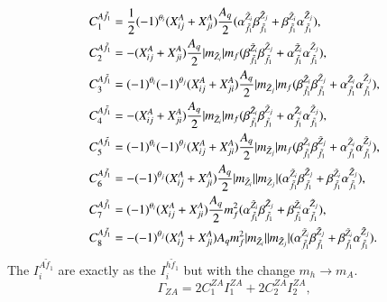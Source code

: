 \documentclass[final,3p,times,pdflatex]{elsarticle}
\begin{document}
\begin{align}
C_{1}^{A \tilde{f}_1} &= \frac{1}{2}(-1)^{\theta_i}(X_{ij}^A + X_{ji}^A) {A_q \over 2} ({\alpha_{\tilde{f}_1}^{\tilde{Z}_i}} {\beta_{\tilde{f}_1}^{\tilde{Z}_j}} + {\beta_{\tilde{f}_1}^{\tilde{Z}_i}}{\alpha_{\tilde{f}_1}^{\tilde{Z}_j}}), \\
C_{2}^{A \tilde{f}_1} &= -(X_{ij}^A + X_{ji}^A) {A_q \over 2} |m_{\tilde{Z}_i}|m_{f} ({\beta_{\tilde{f}_1}^{\tilde{Z}_i}} {\beta_{\tilde{f}_1}^{\tilde{Z}_j}} + {\alpha_{\tilde{f}_1}^{\tilde{Z}_i}}{\alpha_{\tilde{f}_1}^{\tilde{Z}_j}}), \\
C_{3}^{A \tilde{f}_1} &= (-1)^{\theta_i}(-1)^{\theta_j}(X_{ij}^A + X_{ji}^A) {A_q \over 2} |m_{\tilde{Z}_j}|m_{f} ({\beta_{\tilde{f}_1}^{\tilde{Z}_i}} {\beta_{\tilde{f}_1}^{\tilde{Z}_j}} + {\alpha_{\tilde{f}_1}^{\tilde{Z}_i}}{\alpha_{\tilde{f}_1}^{\tilde{Z}_j}}), \\
C_{4}^{A \tilde{f}_1} &= -(X_{ij}^A + X_{ji}^A) {A_q \over 2} |m_{\tilde{Z}_i}|m_{f} ({\beta_{\tilde{f}_1}^{\tilde{Z}_i}} {\beta_{\tilde{f}_1}^{\tilde{Z}_j}} + {\alpha_{\tilde{f}_1}^{\tilde{Z}_i}}{\alpha_{\tilde{f}_1}^{\tilde{Z}_j}}), \\
C_{5}^{A \tilde{f}_1} &= (-1)^{\theta_i}(-1)^{\theta_j}(X_{ij}^A + X_{ji}^A) {A_q \over 2} |m_{\tilde{Z}_j}|m_{f} ({\beta_{\tilde{f}_1}^{\tilde{Z}_i}} {\beta_{\tilde{f}_1}^{\tilde{Z}_j}} + {\alpha_{\tilde{f}_1}^{\tilde{Z}_i}}{\alpha_{\tilde{f}_1}^{\tilde{Z}_j}}), \\
C_{6}^{A \tilde{f}_1} &= -(-1)^{\theta_j}(X_{ij}^A + X_{ji}^A) {A_q \over 2} |m_{\tilde{Z}_i}||m_{\tilde{Z}_j}| ({\alpha_{\tilde{f}_1}^{\tilde{Z}_i}} {\beta_{\tilde{f}_1}^{\tilde{Z}_j}} + {\beta_{\tilde{f}_1}^{\tilde{Z}_i}}{\alpha_{\tilde{f}_1}^{\tilde{Z}_j}}), \\
C_{7}^{A \tilde{f}_1} &= (-1)^{\theta_i}(X_{ij}^A + X_{ji}^A) {A_q \over 2} m_{f}^2 ({\alpha_{\tilde{f}_1}^{\tilde{Z}_i}} {\beta_{\tilde{f}_1}^{\tilde{Z}_j}} + {\beta_{\tilde{f}_1}^{\tilde{Z}_i}}{\alpha_{\tilde{f}_1}^{\tilde{Z}_j}}), \\
C_{8}^{A \tilde{f}_1} &= -(-1)^{\theta_j}(X_{ij}^A + X_{ji}^A) {A_q} m_{f}^2 |m_{\tilde{Z}_i}||m_{\tilde{Z}_j}| ({\alpha_{\tilde{f}_1}^{\tilde{Z}_i}} {\beta_{\tilde{f}_1}^{\tilde{Z}_j}} + {\beta_{\tilde{f}_1}^{\tilde{Z}_i}}{\alpha_{\tilde{f}_1}^{\tilde{Z}_j}}).
\end{align}
The $I_{i}^{A \tilde{f}_1}$ are exactly as the $I_{i}^{h \tilde{f}_1}$ but with the change $m_{h} \rightarrow m_{A}$.
\begin{equation}
\Gamma_{Z A} = 2C_{1}^{Z A} I_{1}^{Z A} + 2C_{2}^{Z A} I_{2}^{Z A},
\end{equation}
\end{document}
